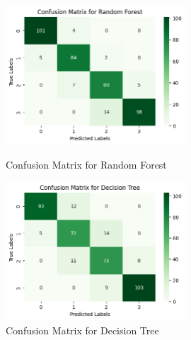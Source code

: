 \documentclass[12pt]{report}
\begin{document}
\begin{figure}[H]
    \centering
		\begin{minipage}{0.45\textwidth}
			\centering
			\includegraphics[height=14em]{cmat_RF.png}
			\caption{Confusion Matrix for Random Forest}
			\label{cmat_RF}
		\end{minipage}
    \hfill
    \begin{minipage}{0.45\textwidth}
        \centering
        \includegraphics[height=14em]{cmat_DT.png}
        \caption{Confusion Matrix for Decision Tree}
        \label{cmat_DT}
    \end{minipage}
    
\end{figure}
\end{document}
